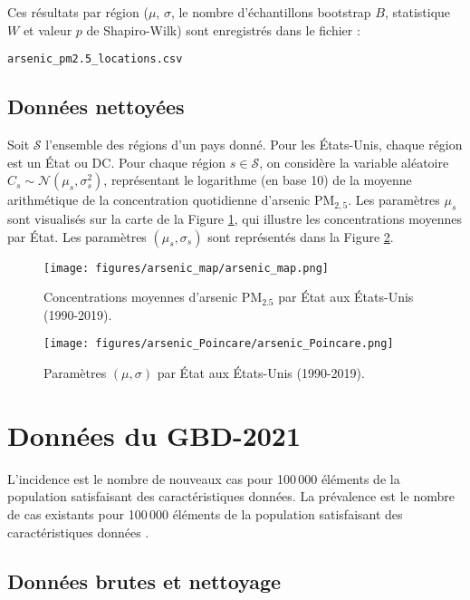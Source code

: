 Ces résultats par région ($\mu$, $\sigma$, le nombre d'échantillons bootstrap $B$, statistique $W$ et valeur $p$ de Shapiro-Wilk) sont enregistrés dans le fichier :
\begin{center}
	\texttt{arsenic\_pm2.5\_locations.csv}
\end{center}

\subsection{Données nettoyées}

Soit $\mathcal{S}$ l'ensemble des régions d'un pays donné. Pour les États-Unis, chaque région est un État ou DC. Pour chaque région $s \in \mathcal{S}$, on considère la variable aléatoire $C_s \sim \mathcal{N}(\mu_s, \sigma_s^2)$, représentant le logarithme (en base 10) de la moyenne arithmétique de la concentration quotidienne d'arsenic PM$_{2,5}$. Les paramètres $\mu_s$ sont visualisés sur la carte de la Figure \ref{fig:arsenic-map}, qui illustre les concentrations moyennes par État. Les paramètres $(\mu_s, \sigma_s)$ sont représentés dans la Figure \ref{fig:arsenic_Poincare}.

\begin{figure}[H]
	\centering
	\texttt{[image: figures/arsenic\_map/arsenic\_map.png]}
	\caption{Concentrations moyennes d'arsenic PM$_{2.5}$ par État aux États-Unis (1990-2019).}
	\label{fig:arsenic-map}
\end{figure}

\begin{figure}[H]
	\centering
	\texttt{[image: figures/arsenic\_Poincare/arsenic\_Poincare.png]}
	\caption{Paramètres $(\mu, \sigma)$ par État aux États-Unis (1990-2019).}
	\label{fig:arsenic_Poincare}
\end{figure}

\section{Données du GBD-2021}
\label{sec:gbd}

L'incidence est le nombre de nouveaux cas pour 100\,000 éléments de la population satisfaisant des caractéristiques données. La prévalence est le nombre de cas existants pour 100\,000 éléments de la population satisfaisant des caractéristiques données \citep{rothman2024epidemiology, kleinbaum1991epidemiologic}.

\subsection{Données brutes et nettoyage}

